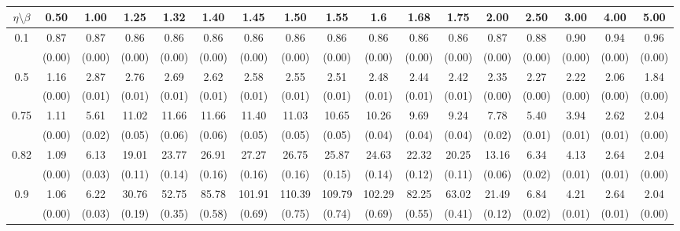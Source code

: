 \documentclass[12pt]{article}  %
\theoremstyle{plain}
\begin{document}
\begin{sidewaystable}[htbp]
\centering
{}
\label{ATS_10-6}
\ \\
\begin{tabular}{ccccccccccccccccc}
\hline
$\eta \setminus \beta $        & 0.50   & 1.00   & 1.25   & 1.32   & 1.40   & 1.45   & 1.50   & 1.55   & 1.6   & 1.68   & 1.75   & 2.00   & 2.50   & 3.00   & 4.00  &5.00 \\ \hline
\multirow{2}{*}{0.1}  & 0.87 &0.87 & 0.86 & 0.86  & 0.86 &  0.86  & 0.86 &  0.86  & 0.86  & 0.86  & 0.86&  0.87 & 0.88 & 0.90 & 0.94 & 0.96 \\
                      & (0.00) & (0.00) & (0.00) & (0.00) & (0.00) & (0.00) & (0.00) & (0.00) & (0.00) & (0.00) & (0.00) & (0.00) & (0.00) & (0.00) & (0.00) & (0.00)\\ \hline
\multirow{2}{*}{0.5}  & 1.16& 2.87 & 2.76 & 2.69  & 2.62 &  2.58  & 2.55  & 2.51  & 2.48 &  2.44 &  2.42 & 2.35 & 2.27 & 2.22 & 2.06 & 1.84 \\
                      & (0.00) & (0.01) & (0.01) & (0.01) & (0.01) & (0.01) & (0.01) & (0.01) & (0.01) & (0.01) & (0.01) & (0.00)  & (0.00) & (0.00) & (0.00)&(0.00)\\ \hline
\multirow{2}{*}{0.75}  & 1.11 &5.61 &11.02 &11.66 & 11.66&  11.40 & 11.03 & 10.65 & 10.26  & 9.69  & 9.24 & 7.78 & 5.40 & 3.94 & 2.62 & 2.04\\
                      & (0.00)& (0.02)& (0.05)& (0.06)& (0.06)& (0.05)& (0.05)& (0.05)& (0.04)&  (0.04)&  (0.04)&  (0.02)&  (0.01)&  (0.01)&  (0.01)  &   (0.00)\\ \hline
\multirow{2}{*}{0.82}  & 1.09 &6.13 &19.01 &23.77&  26.91 & 27.27 & 26.75 & 25.87 & 24.63&  22.32 & 20.25& 13.16 & 6.34 & 4.13 & 2.64 & 2.04\\
                      & (0.00)& (0.03)& (0.11)& (0.14)& (0.16)& (0.16)& (0.16)& (0.15)& (0.14)&  (0.12)&  (0.11)&  (0.06)&  (0.02)&  (0.01)&  (0.01)&   (0.00)\\ \hline
\multirow{2}{*}{0.9}  & 1.06& 6.22& 30.76& 52.75&  85.78 &101.91& 110.39 &109.79& 102.29 & 82.25 & 63.02& 21.49 & 6.84 & 4.21 & 2.64 & 2.04\\
                      & (0.00)& (0.03)& (0.19)& (0.35)& (0.58)& (0.69)& (0.75)& (0.74)& (0.69)&  (0.55)&  (0.41)&  (0.12)&  (0.02)&  (0.01)&  (0.01) &   (0.00)\\ \hline                                               

\end{tabular}
\end{sidewaystable}
\end{document}
